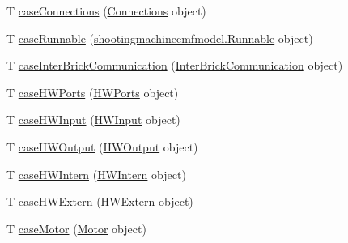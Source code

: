 \begin{DoxyCompactItemize}
\item 
T \hyperlink{classshootingmachineemfmodel_1_1util_1_1_shootingmachineemfmodel_switch_3_01_t_01_4_abed3d0e0836484a6728f1cb5a8a29178}{case\-Connections} (\hyperlink{interfaceshootingmachineemfmodel_1_1_connections}{Connections} object)
\item 
T \hyperlink{classshootingmachineemfmodel_1_1util_1_1_shootingmachineemfmodel_switch_3_01_t_01_4_a91883e392282871cde1dda5d123fcfe0}{case\-Runnable} (\hyperlink{interfaceshootingmachineemfmodel_1_1_runnable}{shootingmachineemfmodel.\-Runnable} object)
\item 
T \hyperlink{classshootingmachineemfmodel_1_1util_1_1_shootingmachineemfmodel_switch_3_01_t_01_4_aa07f358b7740c8e40d949a0bfc4cbb9f}{case\-Inter\-Brick\-Communication} (\hyperlink{interfaceshootingmachineemfmodel_1_1_inter_brick_communication}{Inter\-Brick\-Communication} object)
\item 
T \hyperlink{classshootingmachineemfmodel_1_1util_1_1_shootingmachineemfmodel_switch_3_01_t_01_4_af6e65bc9005b6810313001f19bad9ac3}{case\-H\-W\-Ports} (\hyperlink{interfaceshootingmachineemfmodel_1_1_h_w_ports}{H\-W\-Ports} object)
\item 
T \hyperlink{classshootingmachineemfmodel_1_1util_1_1_shootingmachineemfmodel_switch_3_01_t_01_4_a279ce44e559e1dbce0429dff2f5d05f0}{case\-H\-W\-Input} (\hyperlink{interfaceshootingmachineemfmodel_1_1_h_w_input}{H\-W\-Input} object)
\item 
T \hyperlink{classshootingmachineemfmodel_1_1util_1_1_shootingmachineemfmodel_switch_3_01_t_01_4_a16753eaf6e355562a1a750a7a390b30d}{case\-H\-W\-Output} (\hyperlink{interfaceshootingmachineemfmodel_1_1_h_w_output}{H\-W\-Output} object)
\item 
T \hyperlink{classshootingmachineemfmodel_1_1util_1_1_shootingmachineemfmodel_switch_3_01_t_01_4_ad03e0f30218a8beb379a834d0559cd56}{case\-H\-W\-Intern} (\hyperlink{interfaceshootingmachineemfmodel_1_1_h_w_intern}{H\-W\-Intern} object)
\item 
T \hyperlink{classshootingmachineemfmodel_1_1util_1_1_shootingmachineemfmodel_switch_3_01_t_01_4_a53fa882462f46208c216b1916e8d8566}{case\-H\-W\-Extern} (\hyperlink{interfaceshootingmachineemfmodel_1_1_h_w_extern}{H\-W\-Extern} object)
\item 
T \hyperlink{classshootingmachineemfmodel_1_1util_1_1_shootingmachineemfmodel_switch_3_01_t_01_4_a0b3f23e9ef1cbcbc583eadab80c95eb2}{case\-Motor} (\hyperlink{interfaceshootingmachineemfmodel_1_1_motor}{Motor} object)
\item 

\end{DoxyCompactItemize}
